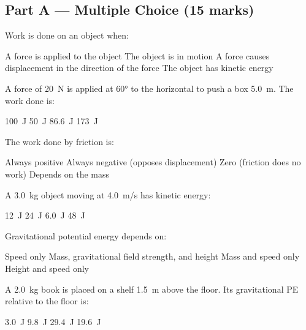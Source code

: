 \documentclass[addpoints]{exam}
\begin{document}
\newpage
\begin{questions}

\section*{Part A --- Multiple Choice (15 marks)}
\vspace{5mm}

\question[1] Work is done on an object when:
\begin{choices}
    \choice A force is applied to the object
    \choice The object is in motion
    \correctchoice A force causes displacement in the direction of the force
    \choice The object has kinetic energy
\end{choices}

\question[1] A force of \SI{20}{N} is applied at \ang{60} to the horizontal to push a
box \SI{5.0}{m}. The work done is:
\begin{choices}
    \choice \SI{100}{J}
    \correctchoice \SI{50}{J}
    \choice \SI{86.6}{J}
    \choice \SI{173}{J}
\end{choices}

\question[1] The work done by friction is:
\begin{choices}
    \choice Always positive
    \correctchoice Always negative (opposes displacement)
    \choice Zero (friction does no work)
    \choice Depends on the mass
\end{choices}

\question[1] A \SI{3.0}{kg} object moving at \SI{4.0}{m/s} has kinetic energy:
\begin{choices}
    \choice \SI{12}{J}
    \correctchoice \SI{24}{J}
    \choice \SI{6.0}{J}
    \choice \SI{48}{J}
\end{choices}

\question[1] Gravitational potential energy depends on:
\begin{choices}
    \choice Speed only
    \correctchoice Mass, gravitational field strength, and height
    \choice Mass and speed only
    \choice Height and speed only
\end{choices}

\question[1] A \SI{2.0}{kg} book is placed on a shelf \SI{1.5}{m} above the floor.
Its gravitational PE relative to the floor is:
\begin{choices}
    \choice \SI{3.0}{J}
    \choice \SI{9.8}{J}
    \correctchoice \SI{29.4}{J}
    \choice \SI{19.6}{J}
\end{choices}


\end{questions}
\end{document}
